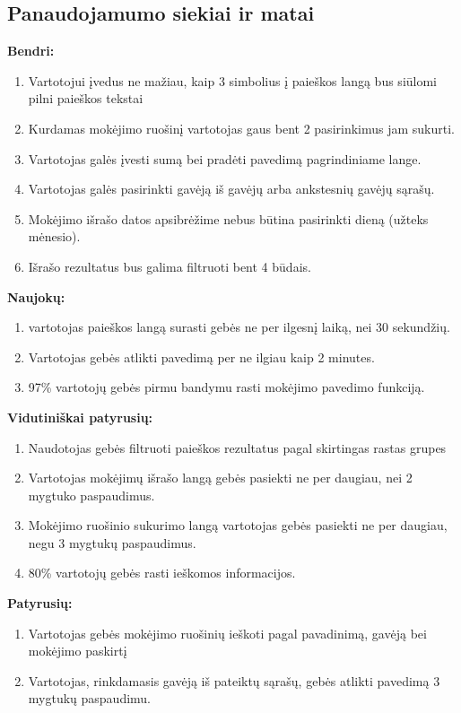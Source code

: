 \documentclass{VUMIFPSkursinis}
\begin{document}
\subsection{Panaudojamumo siekiai ir matai}
	\textbf{Bendri:}
\begin{enumerate}
	\item Vartotojui įvedus ne mažiau, kaip 3 simbolius į paieškos langą bus siūlomi pilni paieškos tekstai
	\item Kurdamas mokėjimo ruošinį vartotojas gaus bent 2 pasirinkimus jam sukurti.
	\item Vartotojas galės įvesti sumą bei pradėti pavedimą pagrindiniame lange.
	\item Vartotojas galės pasirinkti gavėją iš gavėjų arba ankstesnių gavėjų sąrašų.
	\item Mokėjimo išrašo datos apsibrėžime nebus būtina pasirinkti dieną (užteks mėnesio).
	\item Išrašo rezultatus bus galima filtruoti bent 4 būdais.
\end{enumerate}
	\textbf{Naujokų:}
\begin{enumerate}[resume]
	\item vartotojas paieškos langą surasti gebės ne per ilgesnį laiką, nei 30 sekundžių.
	\item Vartotojas gebės atlikti pavedimą per ne ilgiau kaip 2 minutes.
	\item 97\% vartotojų gebės pirmu bandymu rasti mokėjimo pavedimo funkciją.
\end{enumerate}
	\textbf{Vidutiniškai patyrusių:}
\begin{enumerate}[resume]
	\item Naudotojas gebės filtruoti paieškos rezultatus pagal skirtingas rastas grupes
	\item Vartotojas mokėjimų išrašo langą gebės pasiekti ne per daugiau, nei 2 mygtuko paspaudimus.
	\item Mokėjimo ruošinio sukurimo langą vartotojas gebės pasiekti ne per daugiau, negu 3 mygtukų paspaudimus.
	\item 80\% vartotojų gebės rasti ieškomos informacijos.
\end{enumerate}
\textbf{Patyrusių:}
\begin{enumerate}[resume]
	\item Vartotojas gebės mokėjimo ruošinių ieškoti pagal pavadinimą, gavėją bei mokėjimo paskirtį
	\item Vartotojas, rinkdamasis gavėją iš pateiktų sąrašų, gebės atlikti pavedimą 3 mygtukų paspaudimu.
\end{enumerate}
\pagebreak
\end{document}
